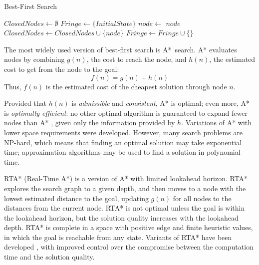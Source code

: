 \begin{algorithm}
\caption{Best-First Search}
\label{alg:bg-best-first-search}
\begin{algorithmic}[1]
\State $ClosedNodes \leftarrow \emptyset$
\State $Fringe \leftarrow \{InitialState\}$
\Loop
    \label{alg:bg-best-first-search-fringe-empty}
  \EndIf
  \State $node \leftarrow $
    \label{alg:bg-best-first-search-goal-reached}
    \Return $node$
  \EndIf
    \State $ClosedNodes \leftarrow ClosedNodes \cup \{node\}$ \label{alg:bg-best-first-search-remember-visited}
    \State $Fringe \leftarrow Fringe \cup \{$$\}$ \label{alg:bg-best-first-search-add-to-fringe}
  \EndIf
\EndLoop
\end{algorithmic}
\end{algorithm}

The most widely used version of best-first search is
A*~search. A* evaluates nodes by combining $g(n)$, the cost to
reach the node, and $h(n)$, the estimated cost to get from the node to the
goal:
\begin{equation}
\label{eq:a-star-heuristic}
f(n)=g(n)+h(n)
\end{equation}
Thus, $f(n)$ is the estimated cost of the cheapest solution through
node $n$.

Provided that $h(n)$ is {\em admissible} and {\em consistent}, A*
is optimal; even more, A* is {\em optimally efficient}: no
other optimal algorithm is guaranteed to expand fewer nodes than A*
, given only the information provided by $h$.
Variations of A* with lower space requirements
were developed. However, many search problems are NP-hard, which
means that finding an optimal solution may take exponential time;
approximation algorithms may be used to find a solution in polynomial
time.

RTA* (Real-Time A*) \cite{Korf.rta} is a  version of A*
with limited lookahead horizon. RTA* explores the search graph to a
given depth, and then moves to a node with the lowest estimated
distance to the goal, updating $g(n)$ for all nodes to the distances
from the current node. RTA* is not optimal unless the goal is within
the lookahead horizon, but the solution quality increases with  the
lookahead depth. RTA* is complete in a space with positive edge  and
finite heuristic values, in which the goal is reachable from any state.
Variants of RTA* have been developed \cite{Russell.right},
\cite{Bulitko.dynamiccontrol}  with improved control over the
compromise between the computation time and the solution quality.

